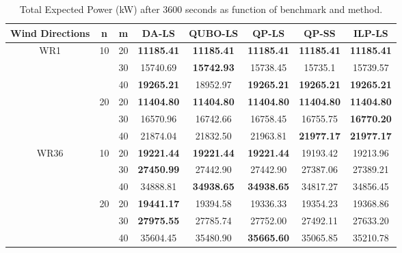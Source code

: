 \documentclass[preprint,12pt]{elsarticle}
\begin{document}
\begin{table}[t!]
	
	\begin{tabular}{| c | c | c | c | c | c | c | c |}
		\toprule
		Wind Directions  & n  & m  & DA-LS  & QUBO-LS  & QP-LS  & QP-SS  & ILP-LS  \\
		\toprule
		\multirow{6}{*}{WR1}  & \multirow{3}{*}{10}       & 20       & \textbf{11185.41} & \textbf{11185.41} & \textbf{11185.41} & \textbf{11185.41} & \textbf{11185.41} \\
		& & 30   & 15740.69 & \textbf{15742.93}  & 15738.45  & 15735.1  & 15739.57     \\
		& & 40 & \textbf{19265.21} & 18952.97 & \textbf{19265.21}  & \textbf{19265.21} & \textbf{19265.21}                \\
		\cline{2-8}
		&\multirow{3}{*}{20}   & 20       & \textbf{11404.80}  & \textbf{11404.80}  & \textbf{11404.80}  & \textbf{11404.80}  & \textbf{11404.80}          \\
		&&30   & 16570.96 & 16742.66  & 16758.45  & 16755.75 & \textbf{16770.20 }                 \\
		&&40   & 21874.04 & 21832.50  & 21963.81 & \textbf{21977.17} & \textbf{21977.17}        \\
		\hline
		\multirow{6}{*}{WR36} &  \multirow{3}{*}{10}    & 20       & \textbf{19221.44} & \textbf{19221.44} & \textbf{19221.44} & 19193.42 & 19213.96 \\
		&& 30  & \textbf{27450.99} & 27442.90 & 27442.90 & 27387.06 & 27389.21                     \\
		&&40   & 34888.81 & \textbf{34938.65} & \textbf{34938.65} & 34817.27  & 34856.45          \\
		\cline{2-8}
		&  \multirow{3}{*}{20}   & 20   & \textbf{19441.17}  & 19394.58 & 19336.33 & 19354.23  & 19368.86            \\
		&&30   & \textbf{27975.55} & 27785.74  & 27752.00 & 27492.11  & 27633.20                      \\
		&&40   & 35604.45 & 35480.90 & \textbf{35665.60}   & 35065.85 & 35210.78 \\
		\bottomrule                   
	\end{tabular}
	
	\vspace{0.5em}
	\caption{Total Expected Power (kW) after 3600 seconds as function of benchmark and method.}\label{tab:results2}
\end{table}
\end{document}
